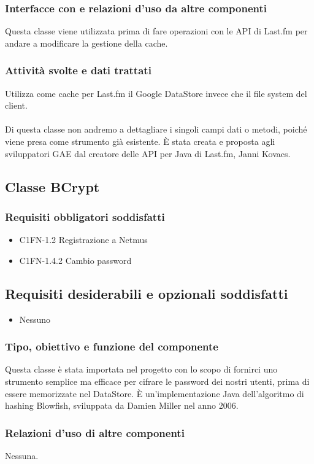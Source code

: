 \subsubsection*{Interfacce con e relazioni d'uso da altre componenti}
Questa classe viene utilizzata prima di fare operazioni con le API di Last.fm
per andare a modificare la gestione della cache.
\subsubsection*{Attivit\`a svolte e dati trattati}
Utilizza come cache per Last.fm il Google DataStore invece che il file system
del client.
\\\\
Di questa classe non andremo a dettagliare i singoli campi dati o metodi,
poich\'e viene presa come strumento gi\`a esistente. \`E stata creata e proposta agli
sviluppatori GAE dal creatore delle API per Java di Last.fm, Janni Kovacs.

\subsection{Classe BCrypt}
\subsubsection*{Requisiti obbligatori soddisfatti}
\begin{itemize}
    \item C1FN-1.2 Registrazione a Netmus
    \item C1FN-1.4.2 Cambio password
\end{itemize}
\subsection*{Requisiti desiderabili e opzionali soddisfatti}
\begin{itemize}
    \item Nessuno
\end{itemize}
\subsubsection*{Tipo, obiettivo e funzione del componente}
Questa classe \`e stata importata nel progetto con lo scopo di fornirci uno
strumento semplice ma efficace per cifrare le password dei nostri utenti, prima
di essere memorizzate nel DataStore. \`E un'implementazione Java dell'algoritmo
di hashing Blowfish, sviluppata da Damien Miller nel anno 2006.
\subsubsection*{Relazioni d'uso di altre componenti}
Nessuna.

